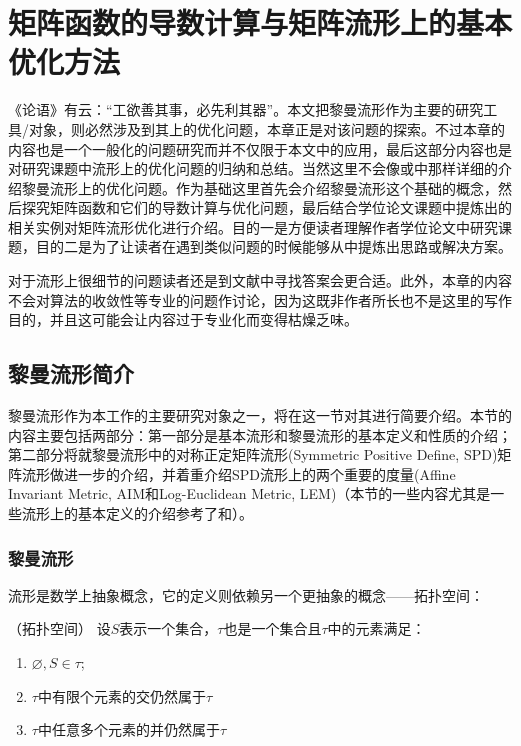\chapter{矩阵函数的导数计算与矩阵流形上的基本优化方法}
\label{chap:Matdev_basicManiopt}
《论语》有云：“工欲善其事，必先利其器”。本文把黎曼流形作为主要的研究工具/对象，则必然涉及到其上的优化问题，本章正是对该问题的探索。不过本章的内容也是一个一般化的问题研究而并不仅限于本文中的应用，最后这部分内容也是对研究课题中流形上的优化问题的归纳和总结。当然这里不会像\cite{Maniopt_DiscreteCurveFitting}或\cite{Maniopt_book}中那样详细的介绍黎曼流形上的优化问题。作为基础这里首先会介绍黎曼流形这个基础的概念，然后探究矩阵函数和它们的导数计算与优化问题，最后结合学位论文课题中提炼出的相关实例对矩阵流形优化进行介绍。目的一是方便读者理解作者学位论文中研究课题，目的二是为了让读者在遇到类似问题的时候能够从中提炼出思路或解决方案。

对于流形上很细节的问题读者还是到文献\cite{Maniopt_DiscreteCurveFitting,Maniopt_book}中寻找答案会更合适。此外，本章的内容不会对算法的收敛性等专业的问题作讨论，因为这既非作者所长也不是这里的写作目的，并且这可能会让内容过于专业化而变得枯燥乏味。
\section{黎曼流形简介}
\label{sec:manifold}
黎曼流形作为本工作的主要研究对象之一，将在这一节对其进行简要介绍。本节的内容主要包括两部分：第一部分是基本流形和黎曼流形的基本定义和性质的介绍；第二部分将就黎曼流形中的对称正定矩阵流形(Symmetric Positive Define, SPD)矩阵流形做进一步的介绍，并着重介绍SPD流形上的两个重要的度量(Affine Invariant Metric, AIM和Log-Euclidean Metric, LEM)（本节的一些内容尤其是一些流形上的基本定义的介绍参考了\cite{Manifold}和\cite{PHDThesis}）。
\subsection{黎曼流形}
\label{sec:manifold_Riemaniann}
流形是数学上抽象概念，它的定义则依赖另一个更抽象的概念——拓扑空间：
\begin{definition}
\label{Topology}
{\heiti（拓扑空间）} 设$S$表示一个集合，$\tau$也是一个集合且$\tau$中的元素满足：
\begin{enumerate}
\item $\varnothing,S \in \tau$;
\item $\tau$中有限个元素的交仍然属于$\tau$
\item $\tau$中任意多个元素的并仍然属于$\tau$
\end{enumerate}
\end{definition}

